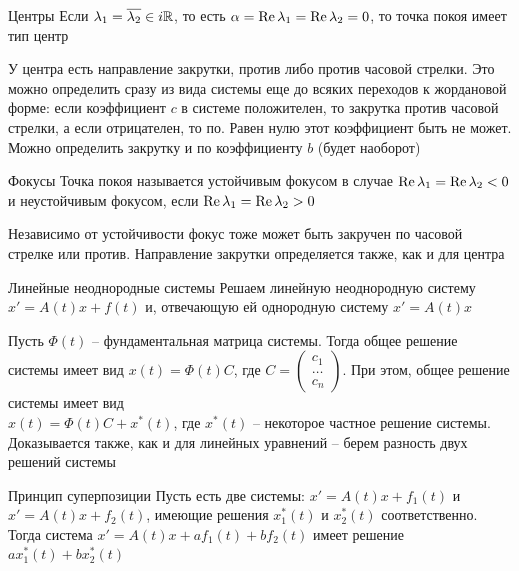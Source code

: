 \documentclass[12pt]{article}
\begin{document}
\begin{defin}{Центры}
    Если $\lambda_1 = \overline{\lambda_2} \in i\mathbb R$, то есть $\alpha = \operatorname{Re} \lambda_1 = \operatorname{Re} \lambda_2 = 0$, то точка покоя имеет тип центр 

    У центра есть направление закрутки, против либо против часовой стрелки. Это можно определить сразу из вида системы еще до всяких переходов к жордановой форме: если коэффициент $c$ в системе положителен, то закрутка против часовой стрелки, а если отрицателен, то по. Равен нулю этот коэффициент быть не может. Можно определить закрутку и по коэффициенту $b$ (будет наоборот)
\end{defin}

\begin{defin}{Фокусы}
    Точка покоя называется устойчивым фокусом в случае $\operatorname{Re} \lambda_1 = \operatorname{Re} \lambda_2 < 0$ и неустойчивым фокусом, если $\operatorname{Re} \lambda_1 = \operatorname{Re} \lambda_2 > 0$

    Независимо от устойчивости фокус тоже может быть закручен по часовой стрелке или против. Направление закрутки определяется также, как и для центра
\end{defin}

\begin{defin}{Линейные неоднородные системы}
    Решаем линейную неоднородную систему $x' = A(t)x + f(t)$ и, отвечающую ей однородную систему $x' = A(t)x$

    Пусть $\Phi(t)$ -- фундаментальная матрица системы. Тогда общее решение системы имеет вид $x(t) = \Phi(t)C$, где $C = \begin{pmatrix}
        c_1 \\
        \ldots \\
        c_n 
    \end{pmatrix}$. При этом, общее решение системы имеет вид \\ $x(t) = \Phi(t)C + x^*(t)$, где $x^*(t)$ -- некоторое частное решение системы. Доказывается также, как и для линейных уравнений -- берем разность двух решений системы 
\end{defin}

\begin{defin}{Принцип суперпозиции}
    Пусть есть две системы: $x' = A(t)x + f_1(t)$ и $x' = A(t)x + f_2(t)$, имеющие решения $x_1^*(t)$ и $x_2^*(t)$ соответственно. Тогда система $x' = A(t)x + af_1(t) + bf_2(t)$ имеет решение $ax_1^*(t) + bx_2^*(t)$
\end{defin}
\end{document}
